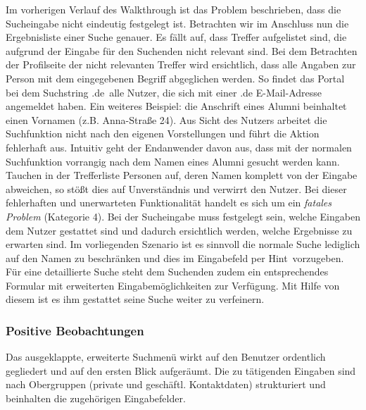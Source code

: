 {
	Im vorherigen Verlauf des Walkthrough ist das Problem beschrieben, dass die Sucheingabe nicht eindeutig festgelegt ist. Betrachten wir im Anschluss nun die Ergebnisliste einer Suche genauer. Es fällt auf, dass Treffer aufgelistet sind, die aufgrund der Eingabe für den Suchenden nicht relevant sind. Bei dem Betrachten der Profilseite der nicht relevanten Treffer wird ersichtlich, dass alle Angaben zur Person mit dem eingegebenen Begriff abgeglichen werden. So findet das Portal bei dem Suchstring \glqq .de\grqq ~alle Nutzer, die sich mit einer .de E-Mail-Adresse angemeldet haben. Ein weiteres Beispiel: die Anschrift eines Alumni beinhaltet einen Vornamen (z.B. Anna-Straße 24).
}
{
	Aus Sicht des Nutzers arbeitet die Suchfunktion nicht nach den eigenen Vorstellungen und führt die Aktion fehlerhaft aus. Intuitiv geht der Endanwender davon aus, dass mit der normalen Suchfunktion vorrangig nach dem Namen eines Alumni gesucht werden kann. Tauchen in der Trefferliste Personen auf, deren Namen komplett von der Eingabe abweichen, so stößt dies auf Unverständnis und verwirrt den Nutzer. Bei dieser fehlerhaften und unerwarteten Funktionalität handelt es sich um ein \emph{fa\-ta\-les Problem} (Kategorie 4).
}
{
	Bei der Sucheingabe muss festgelegt sein, welche Eingaben dem Nutzer gestattet sind und dadurch ersichtlich werden, welche Ergebnisse zu erwarten sind. Im vorliegenden Szenario ist es sinnvoll die normale Suche lediglich auf den Namen zu beschränken und dies im Eingabefeld per \glqq Hint\grqq ~vorzugeben. Für eine detaillierte Suche steht dem Suchenden zudem ein entsprechendes Formular mit erweiterten Eingabemöglichkeiten zur Verfügung. Mit Hilfe von diesem ist es ihm gestattet seine Suche weiter zu verfeinern.
} 
\label{prob:suche:sucheallefelder}


\subsubsection*{Positive Beobachtungen}
Das ausgeklappte, erweiterte Suchmenü wirkt auf den Benutzer ordentlich gegliedert und auf den ersten Blick aufgeräumt. Die zu tätigenden Eingaben sind nach Obergruppen (private und geschäftl. Kontaktdaten) strukturiert und beinhalten die zugehörigen Eingabefelder.

